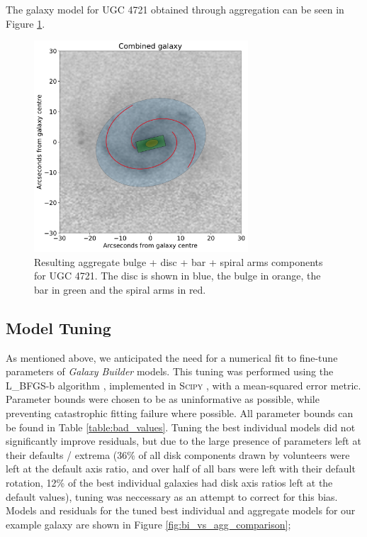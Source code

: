 \documentclass[../main.tex]{subfiles}
\begin{document}
The galaxy model for UGC 4721 obtained through aggregation can be seen in Figure \ref{fig:aggregate_model}.

\begin{figure}
  \includegraphics[width=8cm]{images__method/aggregate_model.pdf}
  \caption{Resulting aggregate bulge + disc + bar + spiral arms components for UGC 4721. The disc is shown in blue, the bulge in orange, the bar in green and the spiral arms in red.}
  \label{fig:aggregate_model}
\end{figure}

\subsection{Model Tuning}

As mentioned above, we anticipated the need for a numerical fit to fine-tune parameters of \textit{Galaxy Builder} models. This tuning was performed using the L\_BFGS-b algorithm \citep{doi:10.1137/0916069}, implemented in \textsc{Scipy} \citep{scipy-paper}, with a mean-squared error metric. Parameter bounds were chosen to be as uninformative as possible, while preventing catastrophic fitting failure where possible. All parameter bounds can be found in Table \ref{table:bad_values}. Tuning the best individual models did not significantly improve residuals, but due to the large presence of parameters left at their defaults / extrema (36\% of all disk components drawn by volunteers were left at the default axis ratio, and over half of all bars were left with their default rotation, 12\% of the best individual galaxies had disk axis ratios left at the default values), tuning was neccessary as an attempt to correct for this bias. Models and residuals for the tuned best individual and aggregate models for our example galaxy are shown in Figure \ref{fig:bi_vs_agg_comparison};
\end{document}
